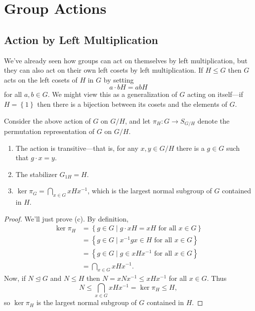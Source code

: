 \documentclass[../m171main.tex]{subfiles}
\begin{document}
\chapter{Group Actions}
\section{Action by Left Multiplication}
We've already seen how groups can act on themselves by left multiplication, but they can also act on their own left cosets by left multiplication.
If $H \leq G$ then $G$ acts on the left cosets of $H$ in $G$ by setting
\[ a \cdot bH = abH \]
for all $a,b \in G$.
We might view this as a generalization of $G$ acting on itself---if $H = \left\{ 1 \right\}$ then there is a bijection between its cosets and the elements of $G$.

\begin{theorem}[]
    Consider the above action of $G$ on $G / H$, and let $\pi_H : G \to S_{G / H}$ denote the permutation representation of $G$ on $G / H$.
    \begin{enumerate}[label=(\alph*),topsep=0pt]
        \item The action is transitive---that is, for any $x,y \in G / H$ there is a $g \in G$ such that $g \cdot x = y$.
        \item The stabilizer $G_{1H} = H$.
        \item $\ker \pi_G = \bigcap_{x \in G} xHx^{-1}$, which is the largest normal subgroup of $G$ contained in $H$.
    \end{enumerate}
\end{theorem}

\begin{proof}
    We'll just prove (c).
    By definition,
    \begin{align*}
        \ker \pi_H &= \left\{ g \in G \mid g \cdot xH = xH \textrm{ for all $x \in G$} \right\} \\
        &= \left\{ g \in G \mid x^{-1} gx \in H \textrm{ for all $x \in G$} \right\} \\
        &= \left\{ g \in G \mid g \in xHx^{-1} \textrm{ for all $x \in G$} \right\} \\
        &= \bigcap_{x \in G} xHx^{-1}.
    \end{align*}
    Now, if $N \trianglelefteq G$ and $N \leq H$ then $N = xNx^{-1} \leq xHx^{-1}$ for all $x \in G$.
    Thus
    \[ N \leq \bigcap_{x \in G} xHx^{-1} = \ker \pi_H \leq H, \]
    so $\ker \pi_H$ is the largest normal subgroup of $G$ contained in $H$.
\end{proof}
\end{document}
